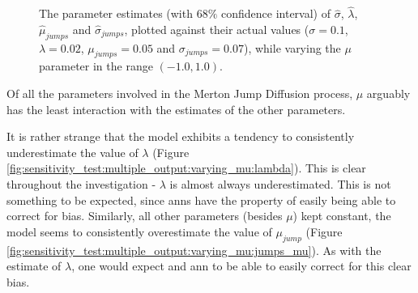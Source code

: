 \documentclass[11pt,oneside,openany,a4paper,english, report, goldenblock
]{usthesis}
\begin{document}
\begin{figure}[h]
{\begin{subfloatrow}
	\end{subfloatrow}}{
		\caption{The parameter estimates (with $68\%$ confidence interval) of $\hat{\sigma}$, $\hat{\lambda}$, $\hat{\mu}_{jumps}$ and $\hat{\sigma}_{jumps}$, plotted against their actual values ($\sigma = 0.1$, $\lambda = 0.02$, $\mu_{jumps} = 0.05$ and $\sigma_{jumps} = 0.07$), while varying the $\mu$ parameter in the range $\left(-1.0, 1.0\right)$.}
		\label{fig:sensitivity_test:multiple_output:varying_mu}}
\end{figure}
Of all the parameters involved in the Merton Jump Diffusion process, $\mu$ arguably has the least interaction with the estimates of the other parameters. 

It is rather strange that the model exhibits a tendency to consistently underestimate the value of $\lambda$ (Figure \ref{fig:sensitivity_test:multiple_output:varying_mu:lambda}). This is clear throughout the investigation - $\lambda$ is almost always underestimated. This is not something to be expected, since \acrshort{ann}s have the property of easily being able to correct for bias.
Similarly, all other parameters (besides $\mu$) kept constant, the model seems to consistently overestimate the value of $\mu_{jump}$ (Figure \ref{fig:sensitivity_test:multiple_output:varying_mu:jumps_mu}). As with the estimate of $\lambda$, one would expect and \acrshort{ann} to be able to easily correct for this clear bias.
\end{document}
